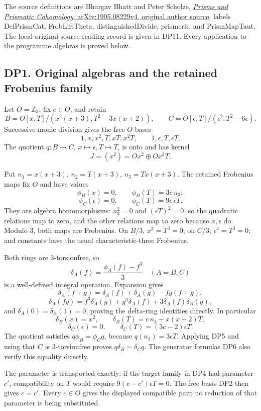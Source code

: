 \documentclass[
  10pt,
  a4paper,
]{article}
\begin{document}
The source definitions are Bhargav Bhatt and Peter Scholze,
\href{https://arxiv.org/src/1905.08229v4}{\emph{Prisms and Prismatic
Cohomology}, arXiv:1905.08229v4, original author source}, labels
DefPrismCat, FrobLiftTheta, distinguishedDivide, prismcrit, and
PrismMapTaut. The local original-source reading record is given in DP11.
Every application to the programme algebras is proved below.

\subsection{DP1. Original algebras and the retained Frobenius
family}\label{dp1.-original-algebras-and-the-retained-frobenius-family}

Let \(O=\mathbb Z_3\), fix \(c\in O\), and retain \[
B=O[x,T]/(x^2(x+3),T^2-3x(x+2)),\qquad
C=O[\epsilon,T]/(\epsilon^2,T^2-6\epsilon).
\tag{DP1}
\] Successive monic division gives the free \(O\)-bases \[
1,x,x^2,T,xT,x^2T,\qquad 1,\epsilon,T,\epsilon T.
\tag{DP2}
\] The quotient \(q:B\to C\), \(x\mapsto\epsilon,T\mapsto T\), is onto
and has kernel \[
J=(x^2)=Ox^2\oplus Ox^2T.
\tag{DP3}
\]

Put \(n_1=x(x+3)\), \(n_2=T(x+3)\), \(n_3=Tx(x+3)\). The retained
Frobenius maps fix \(O\) and have values \[
\phi_B(x)=0,\qquad\phi_B(T)=3c\,n_3;
\] \[
\phi_C(\epsilon)=0,\qquad\phi_C(T)=9c\,\epsilon T.
\tag{DP4}
\] They are algebra homomorphisms: \(n_3^2=0\) and \((\epsilon T)^2=0\),
so the quadratic relations map to zero, and the other relations map to
zero because \(x,\epsilon\) do. Modulo 3, both maps are Frobenius. On
\(B/3\), \(x^3=T^3=0\); on \(C/3\), \(\epsilon^3=T^3=0\); and constants
have the usual characteristic-three Frobenius.

Both rings are 3-torsionfree, so \[
\delta_A(f)=\frac{\phi_A(f)-f^3}{3}\quad(A=B,C)
\tag{DP5}
\] is a well-defined integral operation. Expansion gives \[
\delta_A(f+g)=\delta_A(f)+\delta_A(g)-fg(f+g),
\] \[
\delta_A(fg)=f^3\delta_A(g)+g^3\delta_A(f)+3\delta_A(f)\delta_A(g),
\] and \(\delta_A(0)=\delta_A(1)=0\), proving the delta-ring identities
directly. In particular \[
\delta_B(x)=x^2,\qquad
\delta_B(T)=c\,n_3-x(x+2)T,
\] \[
\delta_C(\epsilon)=0,\qquad
\delta_C(T)=(3c-2)\epsilon T.
\tag{DP6}
\] The quotient satisfies \(q\phi_B=\phi_Cq\), because
\(q(n_3)=3\epsilon T\). Applying DP5 and using that \(C\) is
3-torsionfree proves \(q\delta_B=\delta_Cq\). The generator formulas DP6
also verify this equality directly.

The parameter is transported exactly: if the target family in DP4 had
parameter \(c'\), compatibility on \(T\) would require
\(9(c-c')\epsilon T=0\). The free basis DP2 then gives \(c=c'\). Every
\(c\in O\) gives the displayed compatible pair; no reduction of that
parameter is being substituted.
\end{document}

